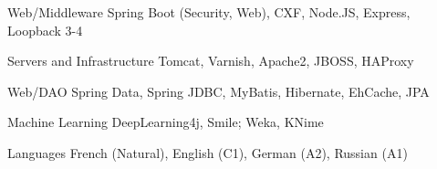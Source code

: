 \begin{cvskills}
  \cvskill
  {Web/Middleware} %
  {Spring Boot (Security, Web), CXF, Node.JS, Express, Loopback 3-4} %
  
  \cvskill
  {Servers and Infrastructure} %
  {Tomcat, Varnish, Apache2, JBOSS, HAProxy} %

  \cvskill
  {Web/DAO} %
  {Spring Data, Spring JDBC, MyBatis, Hibernate, EhCache, JPA} %

  \cvskill
  {Machine Learning} %
  {DeepLearning4j, Smile; Weka, KNime} %
  

  \cvskill
    {Languages} %
    {French (Natural), English (C1), German (A2), Russian (A1)} %

\end{cvskills}
